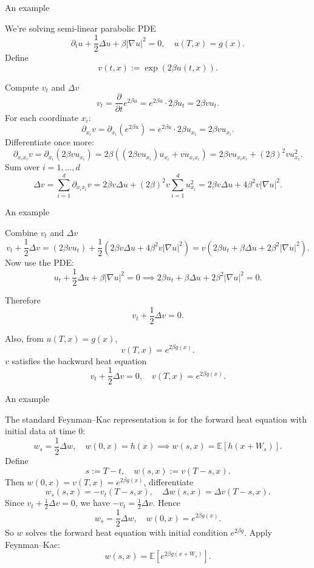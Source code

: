 \documentclass{beamer}
\begin{document}
\begin{frame}{An example}

    {\footnotesize \footnotesize
    We're solving  semi-linear parabolic PDE
\[
\partial_t u + \frac{1}{2} \Delta u + \beta |\nabla u|^2 = 0, \quad u(T, x) = g(x).
\]
Define  
\[
v(t, x) := \exp(2\beta u(t, x)).
\]
\par  \pause Compute \( v_t \) and \(\Delta v\)
\[
v_t = \frac{\partial}{\partial t} e^{2\beta u} = e^{2\beta u} \cdot 2\beta u_t = 2\beta v u_t.
\]
For each coordinate \( x_i \):
\[
\partial_{x_i} v = \partial_{x_i} (e^{2\beta u}) = e^{2\beta u} \cdot 2\beta u_{x_i} = 2\beta v u_{x_i}.
\]
 \pause Differentiate once more:
\[
\partial_{x_i x_i} v = \partial_{x_i} (2\beta v u_{x_i}) 
= 2\beta ((2\beta v u_{x_i}) u_{x_i} + v u_{x_i x_i}) = 2\beta v u_{x_i x_i} + (2\beta)^2 v u_{x_i}^2.
\]
Sum over \( i = 1, \ldots, d \) 
\[
\Delta v = \sum_{i=1}^{d} \partial_{x_i x_i} v = 2\beta v \Delta u + (2\beta)^2 v \sum_{i=1}^{d} u_{x_i}^2 = 2\beta v \Delta u + 4\beta^2 v |\nabla u|^2.
\]

    }
    
\end{frame}

\begin{frame}{An example}

    {\footnotesize \footnotesize
     Combine \( v_t \) and \(\Delta v\)
     \[
    v_t + \frac{1}{2} \Delta v = (2\beta v u_t) + \frac{1}{2} (2\beta v \Delta u + 4\beta^2 v |\nabla u|^2) = v \left( 2\beta u_t + \beta \Delta u + 2\beta^2 |\nabla u|^2 \right).
    \]
    Now use the PDE:
    \[
    u_t + \frac{1}{2} \Delta u + \beta |\nabla u|^2 = 0 \implies 2\beta u_t + \beta \Delta u + 2\beta^2 |\nabla u|^2 = 0.
    \]

     \pause Therefore
    \[
    v_t + \frac{1}{2} \Delta v = 0.
    \]

    Also, from \( u(T, x) = g(x) \),
    \[
    v(T, x) = e^{2\beta g(x)}.
    \]
    \( v \) satisfies the backward heat equation
  \[
  v_t + \frac{1}{2} \Delta v = 0, \quad v(T, x) = e^{2\beta g(x)}.
  \]
    }
    
\end{frame}

\begin{frame}{An example}

    {\footnotesize \footnotesize
       The standard Feynman–Kac representation is for the forward 
       heat equation with initial data at time 0:
    \[
    w_s = \frac{1}{2} \Delta w, \quad w(0, x) = h(x) \implies w(s, x) = \mathbb{E}[h(x + W_s)].
    \]
     \pause Define
  \[
  s := T - t, \quad w(s, x) := v(T - s, x).
  \]
   Then  \( w(0, x) = v(T, x) = e^{2\beta g(x)} \), differentiate 
  \[
  w_s(s, x) = -v_t(T - s, x), \quad \Delta w(s, x) = \Delta v(T - s, x).
  \]
   \pause Since \( v_t + \frac{1}{2} \Delta v = 0 \), we have \(-v_t = \frac{1}{2} \Delta v\). Hence
  \[
  w_s = \frac{1}{2} \Delta w, \quad w(0, x) = e^{2\beta g(x)}.
  \]
   So \( w \) solves the forward heat equation with initial condition \( e^{2\beta g} \). Apply Feynman–Kac:
  \[
  w(s, x) = \mathbb{E}\left[e^{2\beta g(x+W_s)}\right].
  \]

    }
    
\end{frame}
\end{document}
